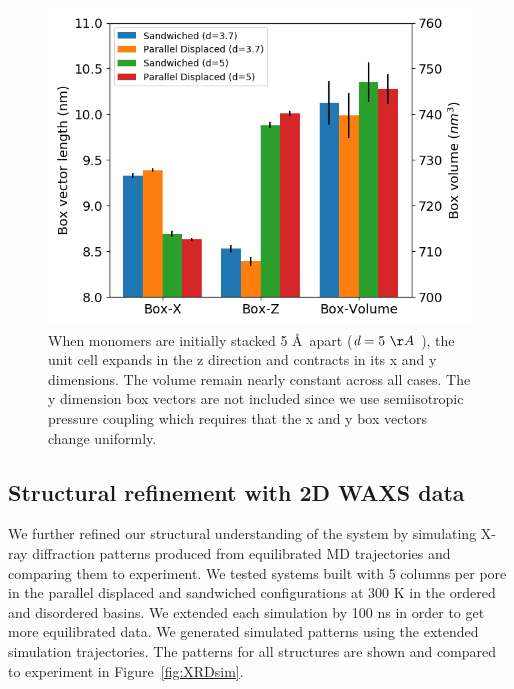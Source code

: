 \documentclass[journal=jpcbfk,manusciprt=article]{achemso}
\begin{document}
  \begin{figure}[!htb]
  \centering
  \includegraphics[width=\textwidth]{box_dimensions.png}
  \caption{When monomers are initially stacked 5 \AA~apart ($\textit{d}=5~\AA~$), the unit cell
  expands in the z direction and contracts in its x and y dimensions. The volume remain nearly
  constant across all cases. The y dimension box vectors are not included since we use 
  semiisotropic pressure coupling which requires that the x and y box vectors change uniformly.}\label{fig:box_dimensions}
  \end{figure}  
  
  \subsection{Structural refinement with 2D WAXS data}
  
  We further refined our structural understanding of the system by simulating X-ray 
  diffraction patterns produced from equilibrated MD trajectories and comparing them
  to experiment. We tested systems built with 5 columns per pore in the parallel 
  displaced and sandwiched configurations at 300 K in the ordered and disordered
  basins. We extended each simulation by 100 ns in order to get more equilibrated 
  data. 
We generated simulated patterns using the extended simulation trajectories.
  The patterns for all structures are shown and compared to experiment in Figure~\ref{fig:XRDsim}.
  
\end{document}
